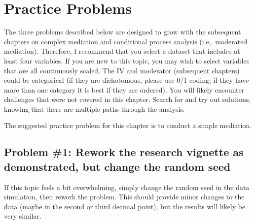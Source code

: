 \documentclass[
  11pt,
]{book}
\begin{document}
\hypertarget{practice-problems-4}{%
\section{Practice Problems}\label{practice-problems-4}}

The three problems described below are designed to grow with the subsequent chapters on complex mediation and conditional process analysis (i.e,. moderated mediation). Therefore, I recommend that you select a dataset that includes at least four variables. If you are new to this topic, you may wish to select variables that are all continuously scaled. The IV and moderator (subsequent chapters) could be categorical (if they are dichotomous, please use 0/1 coding; if they have more than one category it is best if they are ordered). You will likely encounter challenges that were not covered in this chapter. Search for and try out solutions, knowing that there are multiple paths through the analysis.

The suggested practice problem for this chapter is to conduct a simple mediation.

\hypertarget{problem-1-rework-the-research-vignette-as-demonstrated-but-change-the-random-seed}{%
\subsection{Problem \#1: Rework the research vignette as demonstrated, but change the random seed}\label{problem-1-rework-the-research-vignette-as-demonstrated-but-change-the-random-seed}}

If this topic feels a bit overwhelming, simply change the random seed in the data simulation, then rework the problem. This should provide minor changes to the data (maybe in the second or third decimal point), but the results will likely be very similar.
\end{document}
